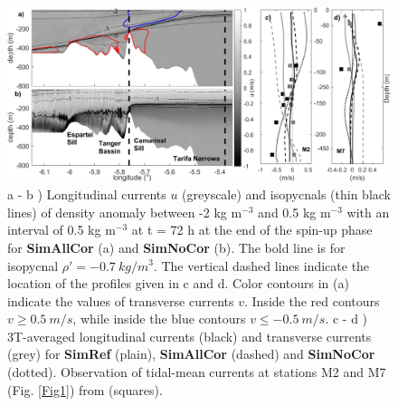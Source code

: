%
\begin{figure}
 \includegraphics[width=\textwidth]{./GBR2D/figure4.png}
 \caption[(a,b) Longitudinal currents and isopycnals. (c,d) Time-averaged longitudinal and transverse currents.]{a - b ) Longitudinal currents $u$ (greyscale) and isopycnals (thin black lines) of density anomaly between -2 kg m$^{-3}$ and 0.5 kg m$^{-3}$ with an interval of 0.5 kg m$^{-3}$ at t = 72 h at the end of the spin-up phase for \textbf{SimAllCor} (a) and \textbf{SimNoCor} (b). The bold line is for isopycnal $\rho' = -0.7 \ kg/m^3$. The vertical dashed lines indicate the location of the profiles given in c and d. Color contours in (a) indicate the values of transverse currents $v$. Inside the red contours $v \geq 0.5 \ m/s$, while inside the blue contours $v \leq -0.5 \ m/s$.  
  c - d ) 3T-averaged longitudinal currents (black) and transverse currents (grey) for \textbf{SimRef} (plain), \textbf{SimAllCor} (dashed) and \textbf{SimNoCor} (dotted). Observation of tidal-mean currents at stations M2 and M7 (Fig. \ref{Fig1}) from \citet{CW90} (squares).}
  \label{fig2}
\end{figure}

